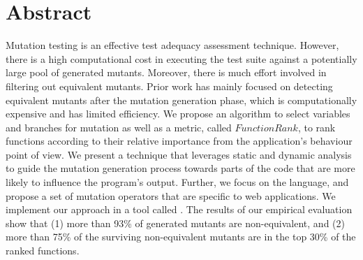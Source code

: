 \section{Abstract}
Mutation testing is an effective test adequacy assessment technique. However, there is a high computational cost in executing the test suite against a potentially large pool of generated mutants. Moreover, there is much effort involved in filtering out equivalent mutants. Prior work has mainly focused on detecting equivalent mutants after the mutation generation phase, which is computationally expensive and has limited efficiency. We propose \cite{mirshokraie:tse15, mirshokraie:icst13} an algorithm to select variables and branches for mutation as well as a metric, called $FunctionRank$, to rank functions according to their relative importance from the application's behaviour point of view. We present a technique that leverages static and dynamic analysis to guide the mutation generation process towards parts of the code that are more likely to influence the program's output. Further, we focus on the \javascript language, and propose a set of mutation operators that are specific to web applications. We implement our approach in a tool called \mutandis. The results of our empirical evaluation show that 
(1) more than 93\% of generated mutants are non-equivalent, 
and (2) more than 75\% of the surviving non-equivalent mutants
are in the top 30\% of the ranked functions.
